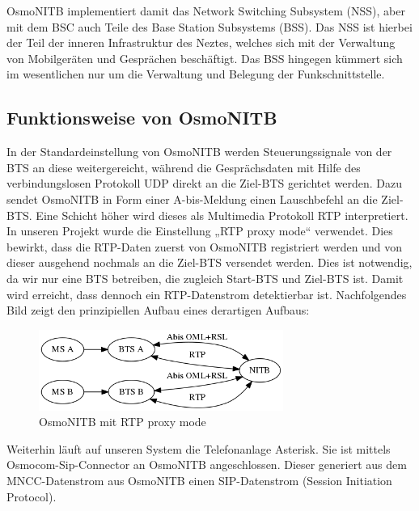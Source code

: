 OsmoNITB implementiert damit das Network Switching Subsystem (NSS), aber mit dem BSC auch Teile des Base Station Subsystems (BSS). Das NSS ist hierbei der Teil der inneren Infrastruktur des Neztes, welches sich mit der Verwaltung von Mobilgeräten und Gesprächen beschäftigt. Das BSS hingegen kümmert sich im wesentlichen nur um die Verwaltung und Belegung der Funkschnittstelle.


\subsection{Funktionsweise von OsmoNITB}

In der Standardeinstellung von OsmoNITB werden Steuerungssignale von der BTS an diese weitergereicht, während die Gesprächsdaten mit Hilfe des verbindungslosen Protokoll UDP direkt an die Ziel-BTS gerichtet werden. Dazu sendet OsmoNITB in Form einer A-bis-Meldung einen Lauschbefehl an die Ziel-BTS. Eine Schicht höher wird dieses als Multimedia Protokoll RTP interpretiert. In unseren Projekt wurde die Einstellung „RTP proxy mode“ verwendet. Dies bewirkt, dass die RTP-Daten zuerst von OsmoNITB registriert werden und von dieser ausgehend nochmals an die Ziel-BTS versendet werden. Dies ist notwendig, da wir nur eine BTS betreiben, die zugleich Start-BTS und Ziel-BTS ist. Damit wird erreicht, dass dennoch ein RTP-Datenstrom detektierbar ist. Nachfolgendes Bild zeigt den prinzipiellen Aufbau eines derartigen Aufbaus:



\begin{figure}[h]
    \centering
    \includegraphics[width=8cm]{includes/osmonitb_rtp_proxy}
    \caption{OsmoNITB mit RTP proxy mode}
	\label{fig:osmonitb2}
\end{figure}


Weiterhin läuft auf unseren System die Telefonanlage Asterisk. Sie ist mittels Osmocom-Sip-Connector an OsmoNITB angeschlossen. Dieser generiert aus dem MNCC-Datenstrom aus OsmoNITB einen SIP-Datenstrom (Session Initiation Protocol).